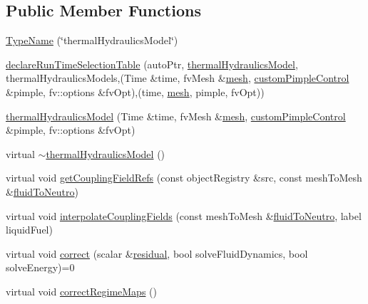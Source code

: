 \subsection*{Public Member Functions}
\begin{DoxyCompactItemize}
\item 
\hyperlink{classFoam_1_1thermalHydraulicsModel_a19dc976b122f86192133fcde73c7cec9}{Type\+Name} (\char`\"{}thermal\+Hydraulics\+Model\char`\"{})
\item 
\hyperlink{classFoam_1_1thermalHydraulicsModel_a22a2c81a4675d5891b88860258c54513}{declare\+Run\+Time\+Selection\+Table} (auto\+Ptr, \hyperlink{classFoam_1_1thermalHydraulicsModel}{thermal\+Hydraulics\+Model}, thermal\+Hydraulics\+Models,(Time \&time, fv\+Mesh \&\hyperlink{createMeshesPostProcess_8H_a8bb1e58291d2d2b653e024a4f4bffe38}{mesh}, \hyperlink{classFoam_1_1customPimpleControl}{custom\+Pimple\+Control} \&pimple, fv\+::options \&fv\+Opt),(time, \hyperlink{createMeshesPostProcess_8H_a8bb1e58291d2d2b653e024a4f4bffe38}{mesh}, pimple, fv\+Opt))
\item 
\hyperlink{classFoam_1_1thermalHydraulicsModel_ad1039cbdb46bf3b93a900b21f0df4f3f}{thermal\+Hydraulics\+Model} (Time \&time, fv\+Mesh \&\hyperlink{createMeshesPostProcess_8H_a8bb1e58291d2d2b653e024a4f4bffe38}{mesh}, \hyperlink{classFoam_1_1customPimpleControl}{custom\+Pimple\+Control} \&pimple, fv\+::options \&fv\+Opt)
\item 
virtual \hyperlink{classFoam_1_1thermalHydraulicsModel_ab7fb1b1e9efe81e14efcf12e414b705f}{$\sim$thermal\+Hydraulics\+Model} ()
\item 
virtual void \hyperlink{classFoam_1_1thermalHydraulicsModel_a3cd2c2ad44390a376cea32f8fb630346}{get\+Coupling\+Field\+Refs} (const object\+Registry \&src, const mesh\+To\+Mesh \&\hyperlink{createMeshInterpolators_8H_a7e07a16eee8c48d8fe1dbdd97238623e}{fluid\+To\+Neutro})
\item 
virtual void \hyperlink{classFoam_1_1thermalHydraulicsModel_abb6dc71d53bb10bf7e411d63d9aa6558}{interpolate\+Coupling\+Fields} (const mesh\+To\+Mesh \&\hyperlink{createMeshInterpolators_8H_a7e07a16eee8c48d8fe1dbdd97238623e}{fluid\+To\+Neutro}, label liquid\+Fuel)
\item 
virtual void \hyperlink{classFoam_1_1thermalHydraulicsModel_af264d7f3edf5ede3bb1190c9b3d18f6a}{correct} (scalar \&\hyperlink{solveThermalMechanics_8H_a840cf6bbf9aacf15bd364b478394c3a7}{residual}, bool solve\+Fluid\+Dynamics, bool solve\+Energy)=0
\item 
virtual void \hyperlink{classFoam_1_1thermalHydraulicsModel_a92cc9aed32e536bb8f1ce35b87b48fc9}{correct\+Regime\+Maps} ()

\end{DoxyCompactItemize}
